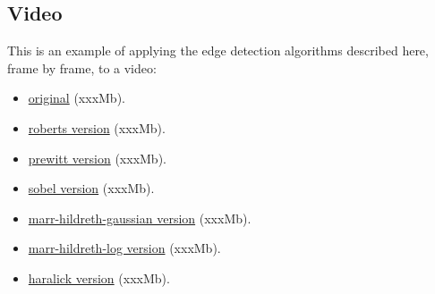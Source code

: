 \documentclass{ipol}
\numberwithin{equation}{section}
\numberwithin{table}{section}
\numberwithin{figure}{section}
\begin{document}




\subsection{Video}


This is an example of applying the edge detection algorithms described here, frame by frame, to a video: 
\begin{itemize}
	\centering
	\item \href{http://iie.fing.edu.uy/~haldos/ipol/video.mov}{original} (xxxMb).
\end{itemize}
\begin{multicols}{2}
\begin{itemize}
	\item \href{http://iie.fing.edu.uy/~haldos/ipol/video-roberts.mov}{roberts version} (xxxMb).
	\item \href{http://iie.fing.edu.uy/~haldos/ipol/video-prewitt.mov}{prewitt version} (xxxMb).
	\item \href{http://iie.fing.edu.uy/~haldos/ipol/video-sobel.mov}{sobel version} (xxxMb).
	\item \href{http://iie.fing.edu.uy/~haldos/ipol/video-marr-hildreth-gaussian.mov}{marr-hildreth-gaussian version} (xxxMb).
	\item \href{http://iie.fing.edu.uy/~haldos/ipol/video-marr-hildreth-log.mov}{marr-hildreth-log version} (xxxMb).
	\item \href{http://iie.fing.edu.uy/~haldos/ipol/video-haralick.mov}{haralick version} (xxxMb).
\end{itemize}
\end{multicols}
\end{document}
